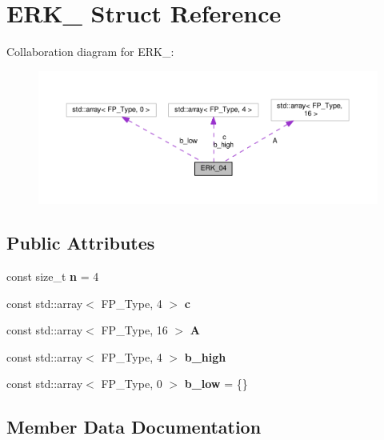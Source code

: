 \hypertarget{structERK__04}{}\section{E\+R\+K\+\_ Struct Reference}
\label{structERK__04}


Collaboration diagram for E\+R\+K\+\_\+:\nopagebreak
\begin{figure}[H]
\begin{center}
\leavevmode
\includegraphics[width=350pt]{structERK__04__coll__graph}
\end{center}
\end{figure}
\subsection*{Public Attributes}
\begin{DoxyCompactItemize}
\item 
\mbox{\label{structERK__04_ad51053d30094b589aad56694c40aa2e3}} 
const size\+\_\+t {\bfseries n} = 4
\item 
const std\+::array$<$ F\+P\+\_\+\+Type, 4 $>$ {\bfseries c}
\item 
const std\+::array$<$ F\+P\+\_\+\+Type, 16 $>$ {\bfseries A}
\item 
const std\+::array$<$ F\+P\+\_\+\+Type, 4 $>$ {\bfseries b\+\_\+high}
\item 
\mbox{\label{structERK__04_a6f360ce6a229e0b3606a6d24f4469d5c}} 
const std\+::array$<$ F\+P\+\_\+\+Type, 0 $>$ {\bfseries b\+\_\+low} = \{\}
\end{DoxyCompactItemize}


\subsection{Member Data Documentation}
\mbox{\label{structERK__04_a09c8913d7fa939adfdf8043561160a41}} 
